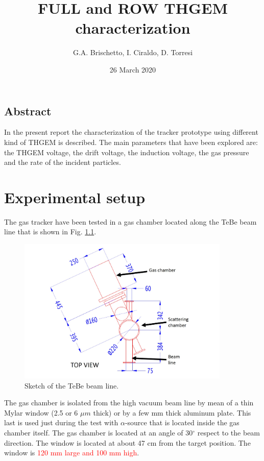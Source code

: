 \documentclass[a4paper, 11 pt]{report}
\title{\bf {\huge FULL and ROW THGEM characterization} }
\author{G.A. Brischetto, I. Ciraldo, D. Torresi}
\date{26 March 2020}
\begin{document}
\maketitle

\section*{Abstract}
In the present report the characterization of the tracker prototype using different kind of THGEM is 
described. The main parameters that have been explored are: the THGEM voltage, the drift voltage,
the induction voltage, the gas pressure and the rate of the incident particles.
\tableofcontents

\chapter{Experimental setup}

The gas tracker have been tested in a gas chamber located along the TeBe beam line that is shown in Fig. 
\ref{fig:TeBeline}.
\begin{figure}
	\centering
	\includegraphics[width=0.9\textwidth]{Immagini/TeBe_scheme.jpg}
	\caption{Sketch of the TeBe beam line.}
	\label{fig:TeBeline}
\end{figure}
The gas chamber is isolated from the high vacuum beam line by mean of a thin Mylar window (2.5 or 6 
$\mu m$ thick) or by a few mm thick aluminum plate. This last is used just during the test with 
$\alpha$-source that is located inside the gas chamber itself. The gas chamber is located at an 
angle of 30$^{\circ}$ respect to the beam direction. The window is located at about 47 cm from the 
target position. The window is \textcolor{red}{ 120 mm large and 100 mm high}.\\
\end{document}
